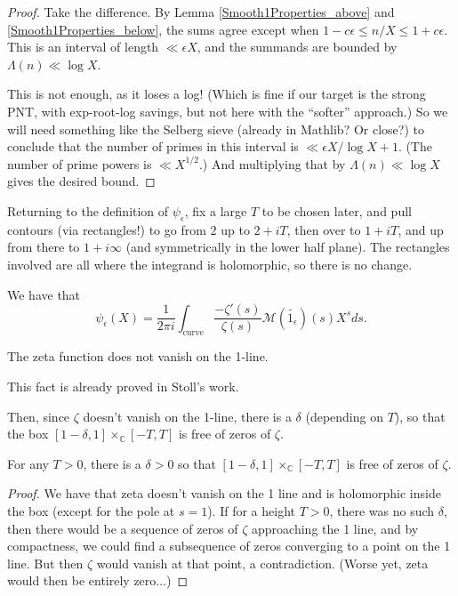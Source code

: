 \begin{proof}
Take the difference. By Lemma \ref{Smooth1Properties_above} and \ref{Smooth1Properties_below},
the sums agree except when $1-c \epsilon \leq n/X \leq 1+c \epsilon$. This is an interval of
length $\ll \epsilon X$, and the summands are bounded by $\Lambda(n) \ll \log X$.

This is not enough, as it loses a log! (Which is fine if our target is the strong PNT, with
exp-root-log savings, but not here with the ``softer'' approach.) So we will need something like
the Selberg sieve (already in Mathlib? Or close?) to conclude that the number of primes in this
interval is $\ll \epsilon X / \log X + 1$.
(The number of prime powers is $\ll X^{1/2}$.)
And multiplying that by $\Lambda (n) \ll \log X$ gives the desired bound.
\end{proof}


Returning to the definition of $\psi_{\epsilon}$, fix a large $T$ to be chosen later, and pull
contours (via rectangles!) to go
from $2$ up to $2+iT$, then over to $1+iT$, and up from there to $1+i\infty$ (and symmetrically
in the lower half plane).  The
rectangles involved are all where the integrand is holomorphic, so there is no change.
\begin{theorem}\label{SmoothedChebyshevPull1}
We have that
$$\psi_{\epsilon}(X) = \frac{1}{2\pi i}\int_{\text{curve}}\frac{-\zeta'(s)}{\zeta(s)}
\mathcal{M}(\widetilde{1_{\epsilon}})(s)
X^{s}ds.$$
\end{theorem}


\begin{theorem}\label{ZetaNoZerosOn1Line}
The zeta function does not vanish on the 1-line.
\end{theorem}
This fact is already proved in Stoll's work.


Then, since $\zeta$ doesn't vanish on the 1-line, there is a $\delta$ (depending on $T$), so that
the box $[1-\delta,1] \times_{ℂ} [-T,T]$ is free of zeros of $\zeta$.
\begin{theorem}\label{ZetaNoZerosInBox}
For any $T>0$, there is a $\delta>0$ so that $[1-\delta,1] \times_{ℂ} [-T,T]$ is free of zeros of
$\zeta$.
\end{theorem}


\begin{proof}
We have that zeta doesn't vanish on the 1 line and is holomorphic inside the box (except for the
pole at $s=1$). If for a height $T>0$, there was no such $\delta$, then there would be a sequence
of zeros of $\zeta$ approaching the 1 line, and by compactness, we could find a subsequence of
zeros converging to a point on the 1 line. But then $\zeta$ would vanish at that point, a
contradiction. (Worse yet, zeta would then be entirely zero...)
\end{proof}


